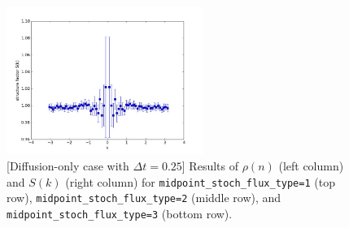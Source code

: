 \documentclass{article}
\begin{document}
\begin{figure}
\includegraphics[width=0.5\linewidth,height=1.9in]{fig1/diff_dt0.25_Sk_mid3.jpg}
\caption{\label{fig_diff_dt0.25_mid_type}[Diffusion-only case with $\Delta t=0.25$] Results of $\rho(n)$ (left column) and $S(k)$ (right column) for \texttt{midpoint\_stoch\_flux\_type=1} (top row), \texttt{midpoint\_stoch\_flux\_type=2} (middle row), and \texttt{midpoint\_stoch\_flux\_type=3} (bottom row).
}
\end{figure}
\end{document}

